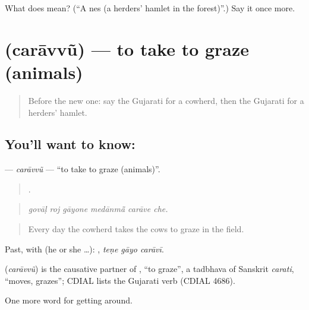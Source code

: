 \begin{tcolorbox}[breakable,colback=teal!4,colframe=teal!35!black,title={Before you move on}]
What does  mean? (\textquotedblleft{}A nes (a herders' hamlet in the forest)\textquotedblright{}.) Say it once more.
\end{tcolorbox}
\section[\texorpdfstring{\gu{ચરાવવું} (carāvvũ)}{ચરાવવું (carāvvũ)}]{ (carāvvũ) — to take to graze (animals)}

\label{lesson:GU-C446-caravvu}



\begin{quote}
Before the new one: say the Gujarati for a cowherd, then the Gujarati for a herders' hamlet.
\end{quote}

\subsection*{You'll want to know: }
\textbf{} — \emph{carāvvũ} — \textquotedblleft{}to take to graze (animals)\textquotedblright{}.

\begin{quote}
     .
\end{quote}

\begin{quote}
\emph{govāḷ roj gāyone medānmā̃ carāve che.}
\end{quote}

\begin{quote}
Every day the cowherd takes the cows to graze in the field.
\end{quote}

Past, with  (he or she …):   , \emph{teṇe gāyo carāvī}.

\begin{cousinweb}
\textbf{} (\emph{carāvvũ}) is the causative partner of , \textquotedblleft{}to graze\textquotedblright{}, a tadbhava of Sanskrit \emph{carati}, \textquotedblleft{}moves, grazes\textquotedblright{}; CDIAL lists the Gujarati verb (CDIAL 4686).
\end{cousinweb}

\begin{grammarlens}[title={What you've built}]
One more word for getting around.
\end{grammarlens}

